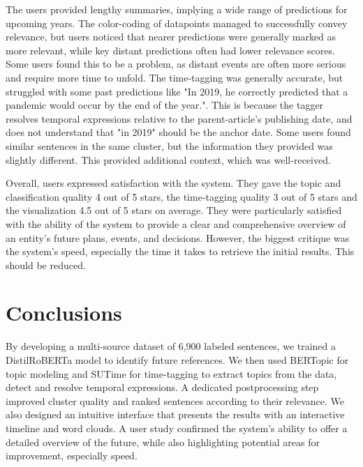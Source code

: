 \documentclass[sigconf]{acmart}
\begin{document}
The users provided lengthy summaries, implying a wide range of predictions for upcoming years. The color-coding of datapoints managed to successfully convey relevance, but users noticed that nearer predictions were generally marked as more relevant, while key distant predictions often had lower relevance scores. Some users found this to be a problem, as distant events are often more serious and require more time to unfold. The time-tagging was generally accurate, but struggled with some past predictions like "In 2019, he correctly predicted that a pandemic would occur by the end of the year.". This is because the tagger resolves temporal expressions relative to the parent-article's publishing date, and does not understand that "in 2019" should be the anchor date. Some users found similar sentences in the same cluster, but the information they provided was slightly different. This provided additional context, which was well-received.

Overall, users expressed satisfaction with the system. They gave the topic and classification quality 4 out of 5 stars, the time-tagging quality 3 out of 5 stars and the visualization 4.5 out of 5 stars on average. They were particularly satisfied with the ability of the system to provide a clear and comprehensive overview of an entity's future plans, events, and decisions. However, the biggest critique was the system's speed, especially the time it takes to retrieve the initial results. This should be reduced.


\section{Conclusions}
By developing a multi-source dataset of 6,900 labeled sentences, we trained a DistilRoBERTa model to identify future references.  We then used BERTopic for topic modeling and SUTime for time-tagging to extract topics from the data, detect and resolve temporal expressions. A dedicated postprocessing step improved cluster quality and ranked sentences according to their relevance. We also designed an intuitive interface that presents the results with an interactive timeline and word clouds. A user study confirmed the system's ability to offer a detailed overview of the future, while also highlighting potential areas for improvement, especially speed.






\end{document}
